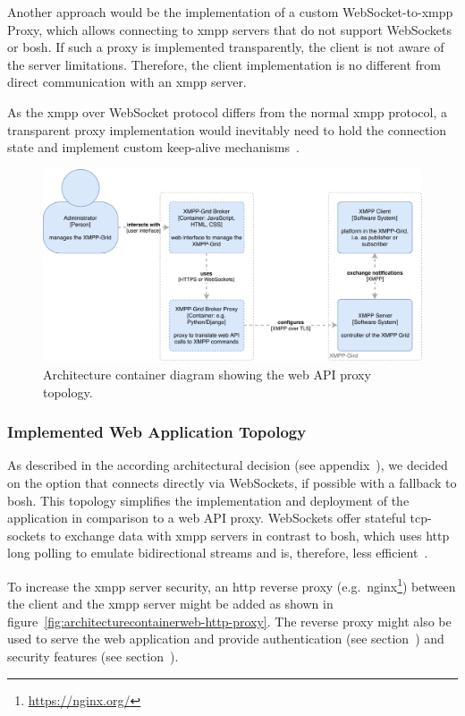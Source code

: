 Another approach would be the implementation of a custom WebSocket-to-\gls{xmpp} Proxy, which allows connecting to \gls{xmpp} servers that do not support WebSockets or \gls{bosh}.
If such a proxy is implemented transparently, the client is not aware of the server limitations.
Therefore, the client implementation is no different from direct communication with an \gls{xmpp} server.

As the \gls{xmpp} over WebSocket protocol differs from the normal \gls{xmpp} protocol, a transparent proxy implementation would inevitably need to hold the connection state and implement custom keep-alive mechanisms~\cite{rfc7395}.

\begin{figure}[H]
\centering
\includegraphics[width=0.8\linewidth]{resources/architecture_container_proxy}
\caption[Architecture container diagram: Web proxy]{Architecture container diagram showing the web API proxy topology.}
\label{fig:architecturecontainerwebproxy}
\end{figure}

\subsubsection{Implemented Web Application Topology}\label{sec:implemented-web-application-topology}

As described in the according architectural decision (see appendix~), we decided on the option that connects directly via WebSockets, if possible with a fallback to \gls{bosh}.
This topology simplifies the implementation and deployment of the application in comparison to a web API proxy.
WebSockets offer stateful \gls{tcp}-sockets to exchange data with \gls{xmpp} servers in contrast to \gls{bosh}, which uses \gls{http} long polling to emulate bidirectional streams and is, therefore, less efficient~\cite{xep-0124}.

To increase the \gls{xmpp} server security, an \gls{http} reverse proxy (e.g.\ nginx\footnote{\url{https://nginx.org/}}) between the client and the \gls{xmpp} server might be added as shown in figure~\ref{fig:architecturecontainerweb-http-proxy}.
The reverse proxy might also be used to serve the web application and provide authentication (see section~) and security features (see section~).

